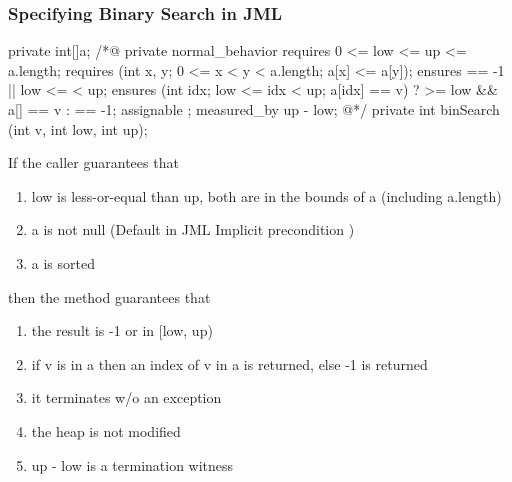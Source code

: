 \subsubsection*{Specifying Binary Search in JML}
\begin{codeBlock}{}
    private int[]a;
    /*@ private normal_behavior
        requires 0 <= low <= up <= a.length;
        requires (\forall int x, y; 0 <= x < y < a.length; a[x] <= a[y]);
        ensures \result == -1 || low <= \result < up;
        ensures (\exists int idx; low <= idx < up; a[idx] == v) ? \result >= low && a[\result] == v : \result == -1;
        assignable \nothing;
        measured_by up - low;
    @*/
    private int binSearch (int v, int low, int up);
\end{codeBlock}
\begin{defBox}[title=Natural Language Specification]
    If the caller guarantees that
    \begin{enumerate}[label=\roman*)]
        \item low is less-or-equal than up, both are in the bounds of a (including a.length)
        \item a is not null (Default in JML Implicit precondition )
        \item a is sorted
    \end{enumerate}
    then the method guarantees that
    \begin{enumerate}[label=\roman*)]
        \item the result is -1 or in [low, up)
        \item if v is in a then an index of v in a is returned, else -1 is returned
        \item it terminates w/o an exception
        \item the heap is not modified
        \item up - low is a termination witness
    \end{enumerate}
\end{defBox}
